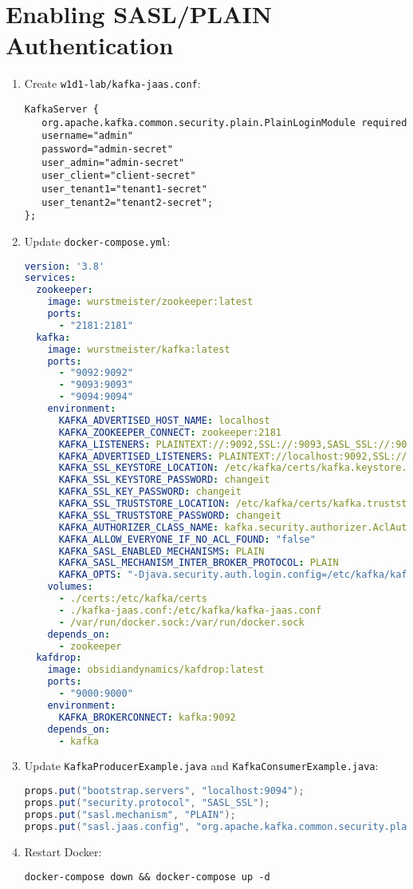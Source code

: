 \documentclass[12pt,a4paper]{report}
\begin{document}
\section{Enabling SASL/PLAIN Authentication}
\begin{enumerate}
    \item Create \texttt{w1d1-lab/kafka-jaas.conf}:
\begin{lstlisting}
KafkaServer {
   org.apache.kafka.common.security.plain.PlainLoginModule required
   username="admin"
   password="admin-secret"
   user_admin="admin-secret"
   user_client="client-secret"
   user_tenant1="tenant1-secret"
   user_tenant2="tenant2-secret";
};
\end{lstlisting}
    \item Update \texttt{docker-compose.yml}:
\begin{lstlisting}[language=yaml]
version: '3.8'
services:
  zookeeper:
    image: wurstmeister/zookeeper:latest
    ports:
      - "2181:2181"
  kafka:
    image: wurstmeister/kafka:latest
    ports:
      - "9092:9092"
      - "9093:9093"
      - "9094:9094"
    environment:
      KAFKA_ADVERTISED_HOST_NAME: localhost
      KAFKA_ZOOKEEPER_CONNECT: zookeeper:2181
      KAFKA_LISTENERS: PLAINTEXT://:9092,SSL://:9093,SASL_SSL://:9094
      KAFKA_ADVERTISED_LISTENERS: PLAINTEXT://localhost:9092,SSL://localhost:9093,SASL_SSL://localhost:9094
      KAFKA_SSL_KEYSTORE_LOCATION: /etc/kafka/certs/kafka.keystore.jks
      KAFKA_SSL_KEYSTORE_PASSWORD: changeit
      KAFKA_SSL_KEY_PASSWORD: changeit
      KAFKA_SSL_TRUSTSTORE_LOCATION: /etc/kafka/certs/kafka.truststore.jks
      KAFKA_SSL_TRUSTSTORE_PASSWORD: changeit
      KAFKA_AUTHORIZER_CLASS_NAME: kafka.security.authorizer.AclAuthorizer
      KAFKA_ALLOW_EVERYONE_IF_NO_ACL_FOUND: "false"
      KAFKA_SASL_ENABLED_MECHANISMS: PLAIN
      KAFKA_SASL_MECHANISM_INTER_BROKER_PROTOCOL: PLAIN
      KAFKA_OPTS: "-Djava.security.auth.login.config=/etc/kafka/kafka-jaas.conf"
    volumes:
      - ./certs:/etc/kafka/certs
      - ./kafka-jaas.conf:/etc/kafka/kafka-jaas.conf
      - /var/run/docker.sock:/var/run/docker.sock
    depends_on:
      - zookeeper
  kafdrop:
    image: obsidiandynamics/kafdrop:latest
    ports:
      - "9000:9000"
    environment:
      KAFKA_BROKERCONNECT: kafka:9092
    depends_on:
      - kafka
\end{lstlisting}
    \item Update \texttt{KafkaProducerExample.java} and \texttt{KafkaConsumerExample.java}:
\begin{lstlisting}[language=java]
props.put("bootstrap.servers", "localhost:9094");
props.put("security.protocol", "SASL_SSL");
props.put("sasl.mechanism", "PLAIN");
props.put("sasl.jaas.config", "org.apache.kafka.common.security.plain.PlainLoginModule required username=\"client\" password=\"client-secret\";");
\end{lstlisting}
    \item Restart Docker:
    \begin{lstlisting}
docker-compose down && docker-compose up -d
    \end{lstlisting}
\end{enumerate}
\end{document}

